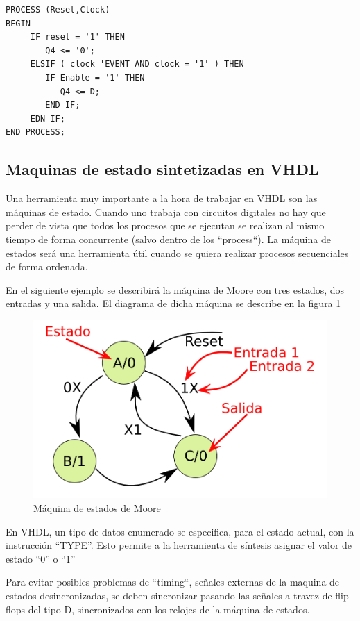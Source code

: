 \begin{lstlisting}[style=vhdl, basicstyle=\footnotesize\ttfamily]
PROCESS (Reset,Clock)
BEGIN
     IF reset = '1' THEN
        Q4 <= '0';
     ELSIF ( clock 'EVENT AND clock = '1' ) THEN
        IF Enable = '1' THEN
           Q4 <= D;
        END IF;
     EDN IF;
END PROCESS;
\end{lstlisting}

\subsection{Maquinas de estado sintetizadas en VHDL}
Una herramienta muy importante a la hora de trabajar en VHDL son las máquinas de estado. 
Cuando uno trabaja con circuitos digitales no hay que perder de vista que todos los procesos
que se ejecutan se realizan al mismo tiempo de forma concurrente (salvo dentro de los ``process``). 
La máquina de estados será una herramienta útil cuando se quiera realizar procesos secuenciales de forma ordenada.

En el siguiente ejemplo se describirá la máquina de Moore con tres estados, dos entradas y una salida.
El diagrama de dicha máquina se describe en la figura \ref{moore} 

\begin{figure}[h]
  \centering
    \includegraphics[width=.6\textwidth]{graficos/moore3.png}
  \caption{Máquina de estados de Moore}
  \label{moore}
\end{figure}

En VHDL, un tipo de datos enumerado se especifica, para el estado actual, con la instrucción ``TYPE''. 
Esto permite a la herramienta de síntesis asignar el valor de estado ``0'' o ``1''

Para evitar posibles problemas de ``timing``, señales externas de la maquina de estados desincronizadas, se deben
sincronizar pasando las señales a travez de flip-flops del tipo D, sincronizados con los relojes de la
máquina de estados.

